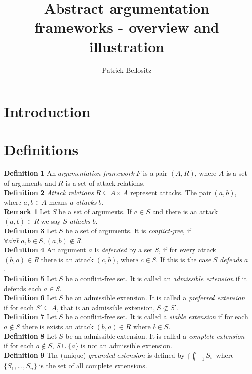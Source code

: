 \documentclass{article}
\newcommand{\nl}{\\[6pt]}
\begin{document}
\title{Abstract argumentation frameworks - overview and illustration}
\author{Patrick Bellositz}
\date{}
\maketitle

\section{Introduction}

\section{Definitions}
\textbf{Definition 1} An \emph{argumentation framework} $F$ is a pair $(A,R)$, where $A$ is a set of arguments and $R$ is a set of attack relations.\nl
\textbf{Definition 2} \emph{Attack relations} $R\subseteq A\times A$ represent attacks. The pair $(a,b)$, where $a,b\in A$ means $a$ \emph{attacks} $b$.\nl
\textbf{Remark 1} Let $S$ be a set of arguments. If $a\in S$ and there is an attack $(a,b)\in R$ we say $S$ \emph{attacks} $b$.\nl
\textbf{Definition 3} Let $S$ be a set of arguments. It is \emph{conflict-free}, if $\forall a \forall b\ a,b\in S, (a,b)\notin R$.\nl
\textbf{Definition 4} An argument $a$ is \emph{defended} by a set $S$, if for every attack $(b,a)\in R$ there is an attack $(c,b)$, where $c\in S$. If this is the case $S$ \emph{defends} $a$.\nl
\textbf{Definition 5} Let $S$ be a conflict-free set. It is called an \emph{admissible extension} if it defends each $a\in S$.\nl
\textbf{Definition 6} Let $S$ be an admissible extension. It is called a \emph{preferred extension} if for each $S'\subseteq A$, that is an admissible extension, $S\not\subset S'$.\nl
\textbf{Definition 7} Let $S$ be a conflict-free set. It is called a \emph{stable extension} if for each $a\not\in S$ there is exists an attack $(b,a)\in R$ where $b\in S$.\nl
\textbf{Definition 8} Let $S$ be an admissible extension. It is called a \emph{complete extension} if for each $a\not\in S$, $S\cup \{a\}$ is not an admissible extension.\nl
\textbf{Definition 9} The (unique) \emph{grounded extension} is defined by $\bigcap\limits_{i=1}^n{S_i}$, where $\{S_1,...,S_n\}$ is the set of all complete extensions.\nl
\end{document}
